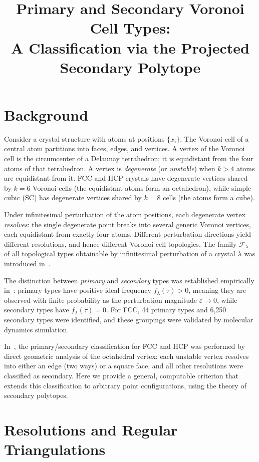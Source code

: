 \documentclass[11pt]{article}
\title{Primary and Secondary Voronoi Cell Types:\\
A Classification via the Projected Secondary Polytope}
\author{}
\date{}
\theoremstyle{definition}
\begin{document}
\maketitle

\section{Background}

Consider a crystal structure with atoms at positions $\{x_i\}$.
The Voronoi cell of a central atom partitions into faces, edges, and
vertices.  A vertex of the Voronoi cell is the circumcenter of a
Delaunay tetrahedron; it is equidistant from the four atoms of that
tetrahedron.  A vertex is \emph{degenerate} (or \emph{unstable}) when
$k > 4$ atoms are equidistant from it.  FCC and HCP crystals have
degenerate vertices shared by $k = 6$ Voronoi cells (the equidistant
atoms form an octahedron), while simple cubic (SC) has degenerate
vertices shared by $k = 8$ cells (the atoms form a cube).

Under infinitesimal perturbation of the atom positions, each degenerate
vertex \emph{resolves}: the single degenerate point breaks into several
generic Voronoi vertices, each equidistant from exactly four atoms.
Different perturbation directions yield different resolutions, and hence
different Voronoi cell topologies.  The family $\mathcal{F}_\lambda$ of
all topological types obtainable by infinitesimal perturbation of a
crystal $\lambda$ was introduced in~\cite{lazar2015}.

The distinction between \emph{primary} and \emph{secondary} types was
established empirically in~\cite{lazar2015}: primary types have positive
ideal frequency $f_\lambda(\tau) > 0$, meaning they are observed with
finite probability as the perturbation magnitude $\varepsilon \to 0$,
while secondary types have $f_\lambda(\tau) = 0$.  For FCC, 44 primary
types and 6{,}250 secondary types were identified, and these groupings
were validated by molecular dynamics simulation.

In~\cite{lazar2015}, the primary/secondary classification for FCC and
HCP was performed by direct geometric analysis of the octahedral vertex:
each unstable vertex resolves into either an edge (two ways) or a square
face, and all other resolutions were classified as secondary.  Here we
provide a general, computable criterion that extends this classification
to arbitrary point configurations, using the theory of secondary
polytopes.


\section{Resolutions and Regular Triangulations}
\end{document}
